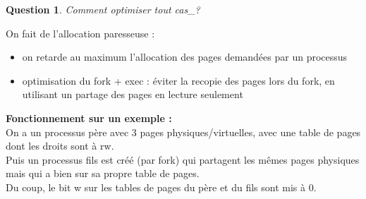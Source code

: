 \documentclass[12pt,a4paper]{report}
\newtheorem*{q}{Question}
\begin{document}
\begin{q}Comment optimiser tout cas_?\end{q}

On fait de l'allocation paresseuse :
\begin{itemize}
\item[\textbf{1$^e$ cas :}] on retarde au maximum l'allocation des pages demandées par un processus
\item[\textbf{2$^e$ cas :}] optimisation du fork + exec : éviter la recopie des pages lors du fork, en utilisant un partage des pages en lecture seulement\\ 
\end{itemize}
\medskip

\textbf{Fonctionnement sur un exemple :}\\
On a un processus père avec 3 pages physiques/virtuelles, avec une table de pages dont les droits sont à rw.\\
Puis un processus fils est créé (par fork) qui partagent les mêmes pages physiques mais qui a bien sur sa propre table de pages.\\
Du coup, le bit w sur les tables de pages du père et du fils sont mis à 0.\\
\end{document}
